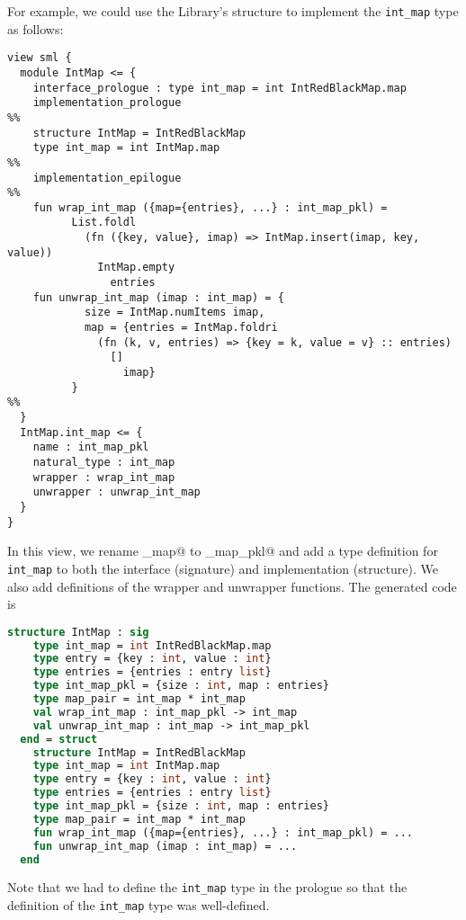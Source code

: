 For example, we could use the \smlnj{} Library's \lstinline@IntRedBlackMap@ structure
to implement the \lstinline!int_map! type as follows:
\begin{code}\begin{lstlisting}[language=ASDL]
view sml {
  module IntMap <= {
    interface_prologue : type int_map = int IntRedBlackMap.map
    implementation_prologue
%%
    structure IntMap = IntRedBlackMap
    type int_map = int IntMap.map
%%
    implementation_epilogue
%%
    fun wrap_int_map ({map={entries}, ...} : int_map_pkl) =
          List.foldl
            (fn ({key, value}, imap) => IntMap.insert(imap, key, value))
              IntMap.empty
                entries
    fun unwrap_int_map (imap : int_map) = {
            size = IntMap.numItems imap,
            map = {entries = IntMap.foldri
              (fn (k, v, entries) => {key = k, value = v} :: entries)
                []
                  imap}
          }
%%
  }
  IntMap.int_map <= {
    name : int_map_pkl
    natural_type : int_map
    wrapper : wrap_int_map
    unwrapper : unwrap_int_map
  }
}
\end{lstlisting}\end{code}%
In this view, we rename \lstinline@int_map@ to \lstinline@int_map_pkl@ and add a type
definition for \lstinline!int_map! to both the interface
(signature) and implementation (structure).
We also add definitions of the wrapper and unwrapper functions.
The generated code is
\begin{code}\begin{lstlisting}[language=SML]
structure IntMap : sig
    type int_map = int IntRedBlackMap.map
    type entry = {key : int, value : int}
    type entries = {entries : entry list}
    type int_map_pkl = {size : int, map : entries}
    type map_pair = int_map * int_map
    val wrap_int_map : int_map_pkl -> int_map
    val unwrap_int_map : int_map -> int_map_pkl
  end = struct
    structure IntMap = IntRedBlackMap
    type int_map = int IntMap.map
    type entry = {key : int, value : int}
    type entries = {entries : entry list}
    type int_map_pkl = {size : int, map : entries}
    type map_pair = int_map * int_map
    fun wrap_int_map ({map={entries}, ...} : int_map_pkl) = ...
    fun unwrap_int_map (imap : int_map) = ...
  end
\end{lstlisting}\end{code}%
Note that we had to define the \lstinline[language=SML]@int_map@ type in
the prologue so that the definition of the \lstinline[language=SML]@int_map@
type was well-defined.

